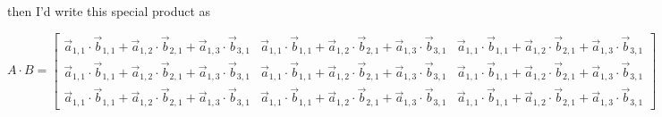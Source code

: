 then I'd write this special product as

$$A \cdot B = \begin{bmatrix}
\vec{a}_{1,1} \cdot \vec{b}_{1,1} + \vec{a}_{1,2} \cdot \vec{b}_{2,1} + \vec{a}_{1,3} \cdot \vec{b}_{3,1} & \vec{a}_{1,1} \cdot \vec{b}_{1,1} + \vec{a}_{1,2} \cdot \vec{b}_{2,1} + \vec{a}_{1,3} \cdot \vec{b}_{3,1} & \vec{a}_{1,1} \cdot \vec{b}_{1,1} + \vec{a}_{1,2} \cdot \vec{b}_{2,1} + \vec{a}_{1,3} \cdot \vec{b}_{3,1}\\
\vec{a}_{1,1} \cdot \vec{b}_{1,1} + \vec{a}_{1,2} \cdot \vec{b}_{2,1} + \vec{a}_{1,3} \cdot \vec{b}_{3,1} & \vec{a}_{1,1} \cdot \vec{b}_{1,1} + \vec{a}_{1,2} \cdot \vec{b}_{2,1} + \vec{a}_{1,3} \cdot \vec{b}_{3,1} & \vec{a}_{1,1} \cdot \vec{b}_{1,1} + \vec{a}_{1,2} \cdot \vec{b}_{2,1} + \vec{a}_{1,3} \cdot \vec{b}_{3,1}\\
\vec{a}_{1,1} \cdot \vec{b}_{1,1} + \vec{a}_{1,2} \cdot \vec{b}_{2,1} + \vec{a}_{1,3} \cdot \vec{b}_{3,1} & \vec{a}_{1,1} \cdot \vec{b}_{1,1} + \vec{a}_{1,2} \cdot \vec{b}_{2,1} + \vec{a}_{1,3} \cdot \vec{b}_{3,1} & \vec{a}_{1,1} \cdot \vec{b}_{1,1} + \vec{a}_{1,2} \cdot \vec{b}_{2,1} + \vec{a}_{1,3} \cdot \vec{b}_{3,1}
\end{bmatrix} 
$$
